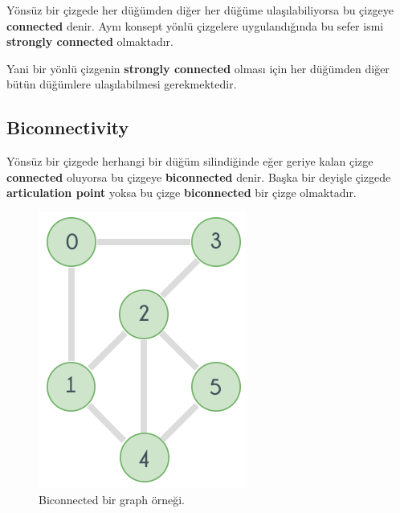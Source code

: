 \documentclass[12pt]{article}
\begin{document}
	Yönsüz bir çizgede her düğümden diğer her düğüme ulaşılabiliyorsa bu çizgeye \textbf{connected} denir. Aynı konsept yönlü çizgelere uygulandığında bu sefer ismi \textbf{strongly connected} olmaktadır.
	
	Yani bir yönlü çizgenin \textbf{strongly connected} olması için her düğümden diğer bütün düğümlere ulaşılabilmesi gerekmektedir.
	\subsection{Biconnectivity}
	Yönsüz bir çizgede herhangi bir düğüm silindiğinde eğer geriye kalan çizge \textbf{connected} oluyorsa bu çizgeye \textbf{biconnected} denir. Başka bir deyişle çizgede \textbf{articulation point} yoksa bu çizge \textbf{biconnected} bir çizge olmaktadır.
\begin{figure}[H]
\centering
\includegraphics[width=\linewidth/3]{biconnectivity.png}
\caption{Biconnected bir graph örneği.}
\label{fig:prime1}
\end{figure}
\end{document}
